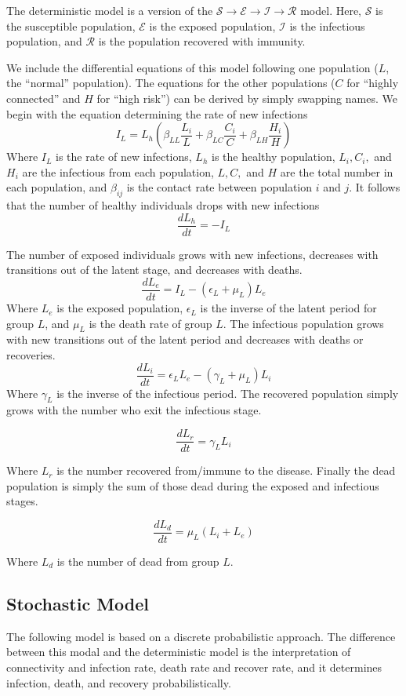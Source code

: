 \documentclass[titlepage]{article}
\begin{document}
The deterministic model is a version of the $\mathcal{S} \rightarrow \mathcal{E} \rightarrow \mathcal{I} \rightarrow \mathcal{R}$ model. Here, $\mathcal{S}$ is the susceptible population, $\mathcal{E}$ is the exposed population, $\mathcal{I}$ is the infectious population, and $\mathcal{R}$ is the population recovered with immunity.

We include the differential equations of this model following one population ($L$, the ``normal'' population). The equations for the other populations ($C$ for ``highly connected'' and $H$ for ``high risk'') can be derived by simply swapping names. We begin with the equation determining the rate of new infections
$$I_L = L_h\left(\beta_{LL}\frac{L_i}{L}
+ \beta_{LC}\frac{C_i}{C}
+ \beta_{LH}\frac{H_i}{H}\right)$$
Where $I_L$ is the rate of new infections, $L_h$ is the healthy population, $L_i, C_i,$ and $H_i$ are the infectious from each population, $L, C,$ and $H$ are the total number in each population, and $\beta_{ij}$ is the contact rate between population $i$ and $j$. It follows that the number of healthy individuals drops with new infections
$$\frac{dL_h}{dt} = -I_L$$

The number of exposed individuals grows with new infections, decreases with transitions out of the latent stage, and decreases with deaths.
$$\frac{dL_e}{dt} = I_L - (\epsilon_L + \mu_L)L_e$$
Where $L_e$ is the exposed population, $\epsilon_L$ is the inverse of the latent period for group $L$, and $\mu_L$ is the death rate of group $L$. The infectious population grows with new transitions out of the latent period and decreases with deaths or recoveries.
$$\frac{dL_i}{dt} = \epsilon_LL_e - (\gamma_L + \mu_L)L_i$$
Where $\gamma_L$ is the inverse of the infectious period. The recovered population simply grows with the number who exit the infectious stage.

$$\frac{dL_r}{dt} = \gamma_LL_i$$

Where $L_r$ is the number recovered from/immune to the disease. Finally the dead population is simply the sum of those dead during the exposed and infectious stages.

$$\frac{dL_d}{dt} = \mu_L(L_i + L_e)$$

Where $L_d$ is the number of dead from group $L$. 

\subsection{Stochastic Model}
The following model is based on a discrete probabilistic approach. The difference between this modal and the deterministic model is the interpretation of connectivity and infection rate, death rate and recover rate, and it determines infection, death, and recovery probabilistically.
\end{document}
